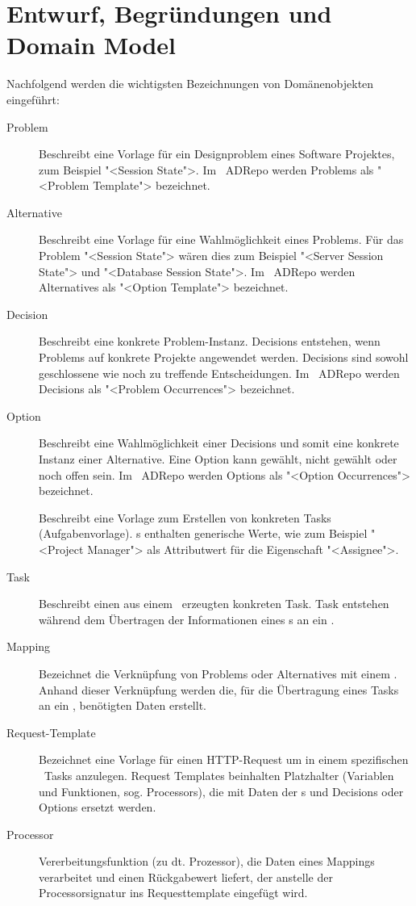 	\section{Entwurf, Begründungen und Domain Model}
		Nachfolgend werden die wichtigsten Bezeichnungen von Domänenobjekten eingeführt:
		
		\begin{description}
			\item[Problem] Beschreibt eine Vorlage für ein Designproblem eines Software Projektes, 
				zum Beispiel "<Session State">. 
				Im \dks\ ADRepo werden Problems als "<Problem Template"> bezeichnet.
			\item[Alternative] Beschreibt eine Vorlage für eine Wahlmöglichkeit eines Problems.
				Für das Problem "<Session State"> wären dies zum Beispiel "<Server Session State"> und 	"<Database Session State">. 
				Im \dks\ ADRepo werden Alternatives als "<Option Template"> bezeichnet.
			\item[Decision] Beschreibt eine konkrete Problem-Instanz.
				Decisions entstehen, wenn Problems auf konkrete Projekte angewendet werden.
				Decisions sind sowohl geschlossene wie noch zu treffende Entscheidungen.
				Im \dks\ ADRepo werden Decisions als "<Problem Occurrences"> bezeichnet.
			\item[Option] Beschreibt eine Wahlmöglichkeit einer Decisions 
				und somit eine konkrete Instanz einer Alternative.
				Eine Option kann gewählt, nicht gewählt oder noch offen sein.
				Im \dks\ ADRepo werden Options als "<Option Occurrences"> bezeichnet.
			\item[\ttpl] Beschreibt eine Vorlage zum Erstellen von konkreten Tasks (Aufgabenvorlage).
				\ttpl s enthalten generische Werte, wie zum Beispiel "<Project Manager"> als
				Attributwert für die Eigenschaft "<Assignee">.
			\item[Task] Beschreibt einen aus einem \ttpl\ erzeugten konkreten Task.
				Task entstehen während dem Übertragen der Informationen eines \ttpl s an ein \ppt.
			\item[Mapping] Bezeichnet die Verknüpfung von Problems oder Alternatives mit einem \ttpl. 
				Anhand dieser Verknüpfung werden die, für die Übertragung eines Tasks an ein \ppt, benötigten Daten erstellt.
			\item[Request-Template] Bezeichnet eine Vorlage für einen HTTP-Request um 
				in einem spezifischen \ppt\ Tasks anzulegen.
				Request Templates beinhalten Platzhalter (Variablen und Funktionen, sog. Processors),
				die mit Daten der \ttpl s und Decisions oder Options ersetzt werden. 
			\item[Processor] Vererbeitungsfunktion (zu dt. Prozessor), 
				die Daten eines Mappings verarbeitet und einen Rückgabewert liefert, 
				der anstelle der Processorsignatur ins Requesttemplate eingefügt wird.
		\end{description}	
	
